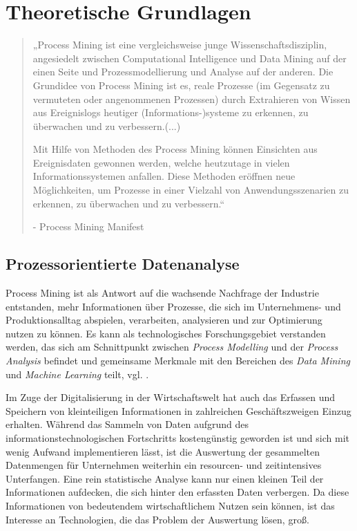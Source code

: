 \chapter{Theoretische Grundlagen}\label{chap:relatedwork}
\fontsize{11}{12}\selectfont\begin{quote}„Process Mining ist eine vergleichsweise junge Wissenschaftsdisziplin, angesiedelt zwischen Computational Intelligence und Data Mining auf der einen Seite und Prozessmodellierung und Analyse auf der anderen. Die Grundidee von Process Mining ist es, reale Prozesse (im Gegensatz zu vermuteten oder angenommenen Prozessen) durch Extrahieren von Wissen aus Ereignislogs heutiger (Informations-)systeme zu erkennen, zu überwachen und zu verbessern.(...) 

Mit Hilfe von Methoden des Process Mining können Einsichten aus Ereignisdaten gewonnen werden, welche heutzutage in vielen Informationssystemen anfallen. Diese Methoden eröffnen neue Möglichkeiten, um Prozesse in einer Vielzahl von Anwendungsszenarien zu erkennen, zu überwachen und zu verbessern.“

- Process Mining Manifest \cite{PMManifesto}\end{quote}
\section{Prozessorientierte Datenanalyse}
Process Mining ist als Antwort auf die wachsende Nachfrage der Industrie entstanden, mehr Informationen über Prozesse, die sich im Unternehmens- und Produktionsalltag abspielen, verarbeiten, analysieren und zur Optimierung nutzen zu können. Es kann als technologisches Forschungsgebiet verstanden werden, das sich am Schnittpunkt zwischen \textit{Process Modelling} und der \textit{Process Analysis} befindet und gemeinsame Merkmale mit den Bereichen des \textit{Data Mining} und \textit{Machine Learning} teilt, vgl. \cite{Ailenei}.

Im Zuge der Digitalisierung in der Wirtschaftswelt hat auch das Erfassen und Speichern von kleinteiligen Informationen in zahlreichen Geschäftszweigen Einzug erhalten. Während das Sammeln von Daten aufgrund des informationstechnologischen Fortschritts kostengünstig geworden ist und sich mit wenig Aufwand implementieren lässt, ist die Auswertung der gesammelten Datenmengen für Unternehmen weiterhin ein resourcen- und zeitintensives Unterfangen. 
Eine rein statistische Analyse kann nur einen kleinen Teil der Informationen aufdecken, die sich hinter den erfassten Daten verbergen. Da diese Informationen von bedeutendem wirtschaftlichem Nutzen sein können, ist das Interesse an Technologien, die das Problem der Auswertung lösen, groß.

